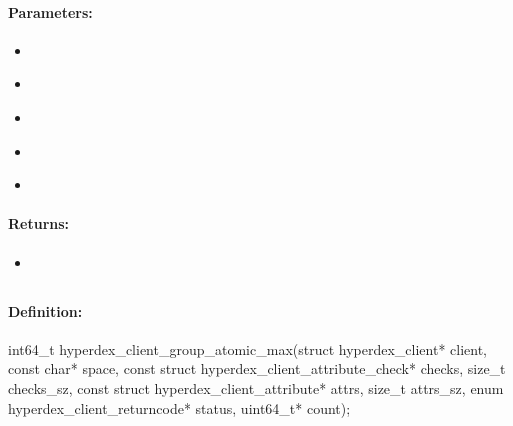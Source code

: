 \paragraph{Parameters:}
\begin{itemize}[noitemsep]
\item {}\\

\item {}\\

\item {}\\

\item {}\\

\item {}\\

\end{itemize}

\paragraph{Returns:}
\begin{itemize}[noitemsep]
\item {}\\

\end{itemize}

\pagebreak
\subsection{}
\label{api:c:group_atomic_max}


\paragraph{Definition:}
\begin{ccode}
int64_t hyperdex_client_group_atomic_max(struct hyperdex_client* client,
        const char* space,
        const struct hyperdex_client_attribute_check* checks, size_t checks_sz,
        const struct hyperdex_client_attribute* attrs, size_t attrs_sz,
        enum hyperdex_client_returncode* status,
        uint64_t* count);
\end{ccode}


